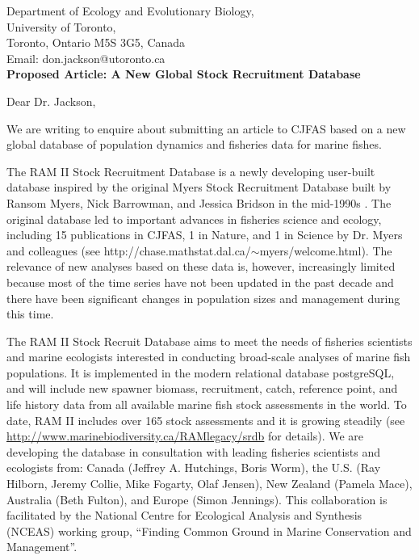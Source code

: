 \documentclass[12pt]{refletter}
\begin{document}
\begin{letter}{
Department of Ecology and Evolutionary Biology,\\
University of Toronto,\\
Toronto, Ontario M5S 3G5, Canada\\
Email: don.jackson@utoronto.ca\\
\vspace{.25cm}
{ \bf Proposed Article: A New Global Stock Recruitment Database}
}

\opening{Dear Dr. Jackson,}

We are writing to enquire about submitting an article to CJFAS based on a new global database of population dynamics and fisheries data for marine fishes. 

The RAM II Stock Recruitment Database is a newly developing user-built database inspired by the original Myers Stock Recruitment Database built by Ransom Myers, Nick Barrowman, and Jessica Bridson in the mid-1990s \citep{Myersetal1995a}. The original database led to important advances in fisheries science and ecology, including 15 publications in CJFAS, 1 in Nature, and 1 in Science by Dr. Myers and colleagues (see http://chase.mathstat.dal.ca/$\sim$myers/welcome.html). The relevance of new analyses based on these data is, however, increasingly limited because most of the time series have not been updated in the past decade and there have been significant changes in population sizes and management during this time.

The RAM II Stock Recruit Database aims to meet the needs of fisheries scientists and marine ecologists interested in conducting broad-scale analyses of marine fish populations. It is implemented in the modern relational database postgreSQL, and will include new spawner biomass, recruitment, catch, reference point, and life history data from all available marine fish stock assessments in the world. To date, RAM II includes over 165 stock assessments and it is growing steadily (see \url{http://www.marinebiodiversity.ca/RAMlegacy/srdb} for details). We are developing the database in consultation with leading fisheries scientists and ecologists from: Canada (Jeffrey A. Hutchings, Boris Worm), the U.S. (Ray Hilborn, Jeremy Collie, Mike Fogarty, Olaf Jensen), New Zealand (Pamela Mace), Australia (Beth Fulton), and Europe (Simon Jennings). This collaboration is facilitated by the National Centre for Ecological Analysis and Synthesis (NCEAS) working group, ``Finding Common Ground in Marine Conservation and Management''. 


\end{letter}
\end{document}
